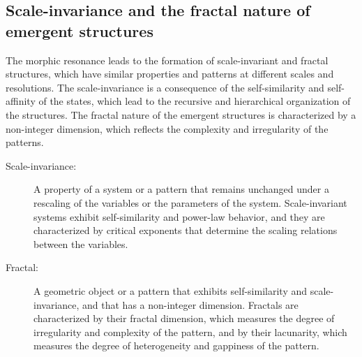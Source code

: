\subsection{Scale-invariance and the fractal nature of emergent structures}
The morphic resonance leads to the formation of scale-invariant and fractal structures, which have similar properties and patterns at different scales and resolutions. The scale-invariance is a consequence of the self-similarity and self-affinity of the states, which lead to the recursive and hierarchical organization of the structures. The fractal nature of the emergent structures is characterized by a non-integer dimension, which reflects the complexity and irregularity of the patterns.

\begin{tcolorbox}[colback=blue!5!white,colframe=blue!75!black,title=New terms]
\begin{description}
\item[Scale-invariance:] A property of a system or a pattern that remains unchanged under a rescaling of the variables or the parameters of the system. Scale-invariant systems exhibit self-similarity and power-law behavior, and they are characterized by critical exponents that determine the scaling relations between the variables.
\item[Fractal:] A geometric object or a pattern that exhibits self-similarity and scale-invariance, and that has a non-integer dimension. Fractals are characterized by their fractal dimension, which measures the degree of irregularity and complexity of the pattern, and by their lacunarity, which measures the degree of heterogeneity and gappiness of the pattern.
\end{description}
\end{tcolorbox}